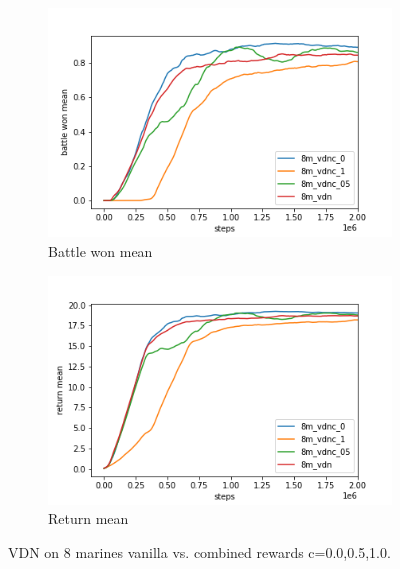 \begin{figure}[h!]
	\centering
	\begin{subfigure}[b]{0.49\textwidth}
		\includegraphics[width=\textwidth]{img/results/vdnc_8m/battle_won_mean.png}
		\caption{Battle won mean}
	\end{subfigure}
	\hfill
	\begin{subfigure}[b]{0.49\textwidth}
		\includegraphics[width=\textwidth]{img/results/vdnc_8m/return_mean.png}
		\caption{Return mean}
	\end{subfigure}
	
	\caption{VDN on 8 marines vanilla vs. combined rewards c=0.0,0.5,1.0.}
	\label{fig:vdn_8m_results}
\end{figure}

